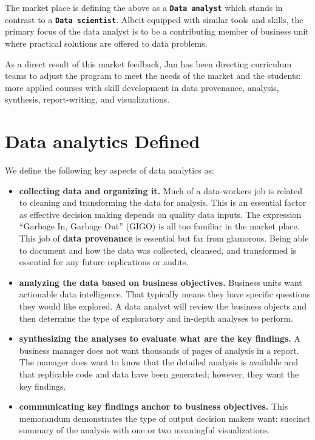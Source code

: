 \documentclass[]{article}
\begin{document}
The market place is defining the above as a \textbf{\tt{Data analyst}}
which stands in contrast to a \textbf{\tt{Data scientist}}. Albeit
equipped with similar tools and skills, the primary focus of the data
analyst is to be a contributing member of business unit where practical
solutions are offered to data problems.

As a direct result of this market feedback, Jan has been directing
curriculum teams to adjust the program to meet the needs of the market
and the students: more applied courses with skill development in data
provenance, analysis, synthesis, report-writing, and visualizations.

\newpage
\section{ Data analytics Defined}
\label{sec:da}

We define the following key aspects of data analytics as:

\begin{itemize}
\item
  \textbf{collecting data and organizing it.} Much of a data-workers job
  is related to cleaning and transforming the data for analysis. This is
  an essential factor as effective decision making depends on quality
  data inputs. The expression ``Garbage In, Garbage Out'' (GIGO) is all
  too familiar in the market place. This job of \textbf{data provenance}
  is essential but far from glamorous. Being able to document and how
  the data was collected, cleansed, and transformed is essential for any
  future replications or audits.
\item
  \textbf{analyzing the data based on business objectives.} Business
  units want actionable data intelligence. That typically means they
  have specific questions they would like explored. A data analyst will
  review the business objects and then determine the type of exploratory
  and in-depth analyses to perform.
\item
  \textbf{synthesizing the analyses to evaluate what are the key
  findings.} A business manager does not want thousands of pages of
  analysis in a report. The manager does want to know that the detailed
  analysis is available and that replicable code and data have been
  generated; however, they want the key findings.
\item
  \textbf{communicating key findings anchor to business objectives.}
  This memorandum demonstrates the type of output decision makers want:
  succinct summary of the analysis with one or two meaningful
  visualizations.
\end{itemize}
\end{document}
